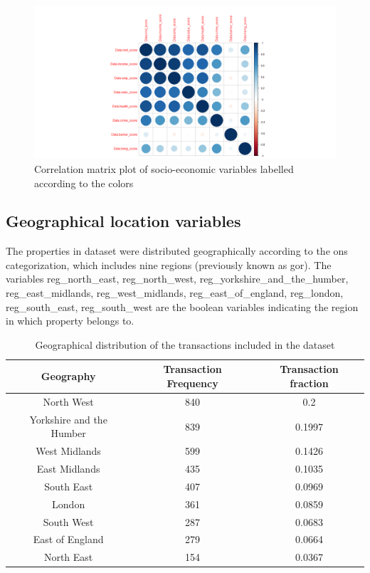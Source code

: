 \documentclass[12pt]{article}
\begin{document}
\begin{figure}[H]
    \centering
    \includegraphics[width=18cm]{corrmat.png}
    \caption{Correlation matrix plot of socio-economic variables labelled according to the colors}
    \label{fig:corrmat}
\end{figure}

\subsection{Geographical location variables}
 The properties in dataset were distributed geographically according to the \acrfull{ons} categorization, which includes nine regions (previously known as \acrshort{gor}). The variables reg\_north\_east, reg\_north\_west, reg\_yorkshire\_and\_the\_humber, reg\_east\_midlands, reg\_west\_midlands, reg\_east\_of\_england, reg\_london, reg\_south\_east, reg\_south\_west are the boolean variables indicating the region in which property belongs to.

  \begin{table}[H]
\centering
\begin{tabular}{c c c} 
 \hline
 Geography & Transaction Frequency & Transaction fraction \\ [0.5ex] 
 \hline
 North West & 840 & 0.2 \\
 Yorkshire and the Humber & 839 & 0.1997 \\
 West Midlands & 599 & 0.1426 \\
 East Midlands & 435 & 0.1035 \\
 South East & 407 & 0.0969 \\
 London & 361 & 0.0859 \\
 South West & 287 & 0.0683 \\
 East of England & 279 & 0.0664 \\
 North East & 154 & 0.0367 \\ [1ex] 
 \hline
\end{tabular}
\caption{Geographical distribution of the transactions included in the dataset}
\label{table:geo}
\end{table}
 
\end{document}
